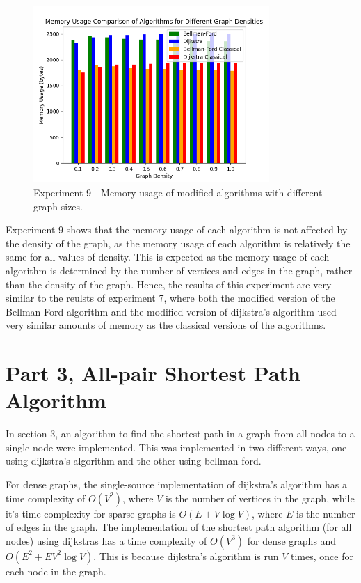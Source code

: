 \documentclass{article}
\begin{document}
\begin{onehalfspace}
\begin{figure}[H] 
    \centering
    \includegraphics[width=0.8\textwidth]{Figures/Memory_densities.png} 
    \caption{\footnotesize Experiment 9 - Memory usage of modified algorithms with different graph sizes.}
    \label{fig:Figure 9} 
\end{figure}

Experiment 9 shows that the memory usage of each algorithm is not affected by the density of the graph, as the memory usage of each algorithm is relatively the same for all values of density.
This is expected as the memory usage of each algorithm is determined by the number of vertices and edges in the graph, rather than the density of the graph.
Hence, the results of this experiment are very similar to the reulsts of experiment 7, where both the modified version of the Bellman-Ford algorithm and the modified version of dijkstra's algorithm used very similar amounts of memory as the classical versions of the algorithms.

\section*{Part 3, All-pair Shortest Path Algorithm}
In section 3, an algorithm to find the shortest path in a graph from all nodes to a single node were implemented. 
This was implemented in two different ways, one using dijkstra's algorithm and the other using bellman ford.

\smallskip
For dense graphs, the single-source implementation of dijkstra's algorithm has a time complexity of $O(V^2)$,
where $V$ is the number of vertices in the graph, while it's time complexity for sparse graphs is $O(E + V \log V)$, where $E$ is the number of edges in the graph.
The implementation of the shortest path algorithm (for all nodes) using dijkstras has a time complexity of 
$O(V^3)$ for dense graphs and $O(E^2 + EV^2 \log V)$. This is because dijkstra's algorithm is run $V$ times, once for each node in the graph.


\end{onehalfspace}
\end{document}

